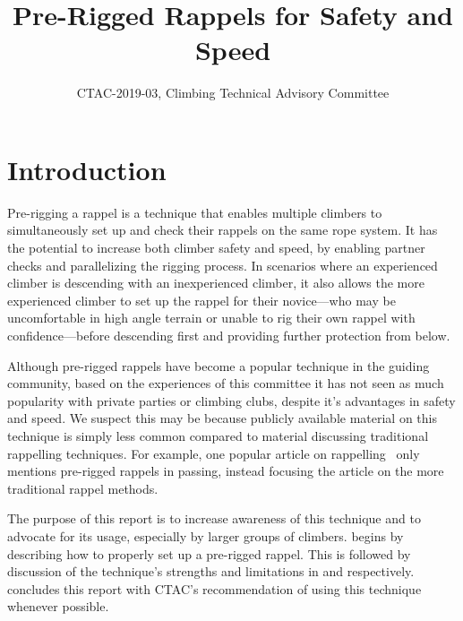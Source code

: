 \documentclass[nonacm,acmtog]{acmart}
\title{Pre-Rigged Rappels for Safety and Speed}
\subtitle{CTAC-2019-03, Climbing Technical Advisory Committee}
\begin{document}
\maketitle

\section{Introduction}
\label{sec:intro}

  Pre-rigging a rappel is a technique that enables multiple climbers to
  simultaneously set up and check their rappels on the same rope system.  It
  has the potential to increase both climber safety and speed, by enabling
  partner checks and parallelizing the rigging process.  In scenarios where an
  experienced climber is descending with an inexperienced climber, it also
  allows the more experienced climber to set up the rappel for their
  novice---who may be uncomfortable in high angle terrain or unable to rig
  their own rappel with confidence---before descending first and providing
  further protection from below.

  Although pre-rigged rappels have become a popular technique in the guiding
  community, based on the experiences of this committee it has not seen as much
  popularity with private parties or climbing clubs, despite it's advantages in
  safety and speed.  We suspect this may be because publicly available material
  on this technique is simply less common compared to material discussing
  traditional rappelling techniques.  For example, one popular article on
  rappelling~\cite{www:aac-rappelling} only mentions pre-rigged rappels in
  passing, instead focusing the article on the more traditional rappel methods.

  The purpose of this report is to increase awareness of this technique and to
  advocate for its usage, especially by larger groups of climbers.
   begins by describing how to properly set up a pre-rigged
  rappel.  This is followed by discussion of the technique's strengths and
  limitations in  and 
  respectively.
   concludes this report with CTAC's
  recommendation of using this technique whenever possible.
\end{document}
